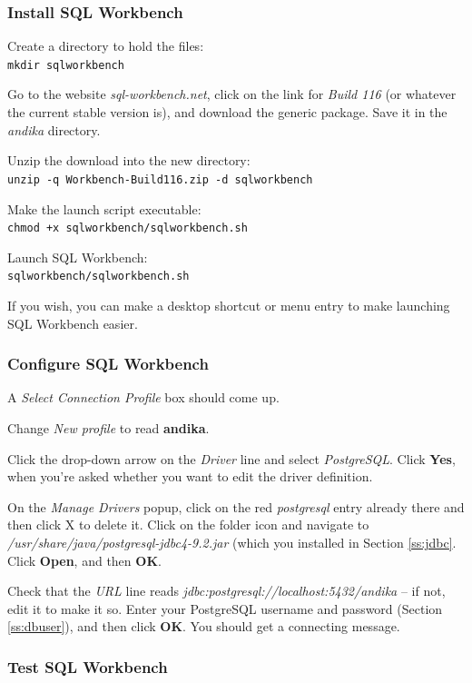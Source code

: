 \subsubsection{Install SQL Workbench}

Create a directory to hold the files:\\
\verb|mkdir sqlworkbench|

Go to the website \textit{sql-workbench.net}, click on the link for \textit{Build 116} (or whatever the current stable version is), and download the generic package.  Save it in the \textit{andika} directory.

Unzip the download into the new directory:\\
\verb|unzip -q Workbench-Build116.zip -d sqlworkbench|

Make the launch script executable:\\
\verb|chmod +x sqlworkbench/sqlworkbench.sh|

Launch SQL Workbench:\\
\verb|sqlworkbench/sqlworkbench.sh|

If you wish, you can make a desktop shortcut or menu entry to make launching SQL Workbench easier.

\subsubsection{Configure SQL Workbench}

A \textit{Select Connection Profile} box should come up. 

Change \textit{New profile} to read \textbf{andika}.

Click the drop-down arrow on the \textit{Driver} line and select \textit{PostgreSQL}. Click \textbf{Yes}, when you're asked whether you want to edit the driver definition.

On the \textit{Manage Drivers} popup, click on the red \textit{postgresql} entry already there and then click X to delete it.  Click on the folder icon and navigate to \textit{/usr/share/java/postgresql-jdbc4-9.2.jar} (which you installed in Section \ref{ss:jdbc}.  Click \textbf{Open}, and then \textbf{OK}.

Check that the \textit{URL} line reads \textit{jdbc:postgresql://localhost:5432/andika} -- if not, edit it to make it so. Enter your PostgreSQL username and password (Section \ref{ss:dbuser}), and then click \textbf{OK}.  You should get a connecting message.

\subsubsection{Test SQL Workbench}

